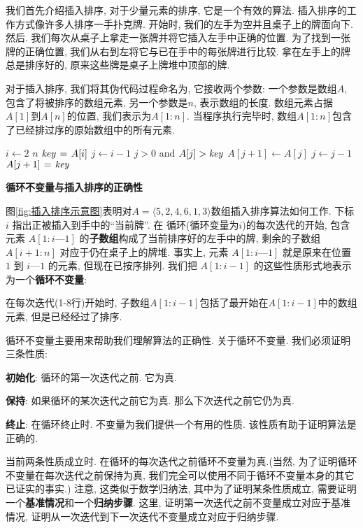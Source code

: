 \documentclass[oneside,10pt]{ctexbook}
\begin{document}
我们首先介绍插入排序, 对于少量元素的排序, 它是一个有效的算法. 插入排序的工作方式像许多人排序一手扑克牌. 开始时, 我们的左手为空并且桌子上的牌面向下. 然后. 我们每次从桌子上拿走一张牌并将它插入左手中正确的位置. 为了找到一张牌的正确位置, 我们从右到左将它与已在手中的每张牌进行比较. 拿在左手上的牌总是排序好的, 原来这些牌是桌子上牌堆中顶部的牌.

对于插入排序, 我们将其伪代码过程命名为, 它接收两个参数: 一个参数是数组$A$, 包含了将被排序的数组元素, 另一个参数是$n$, 表示数组的长度. 数组元素占据$A[1]$到$A[n]$的位置, 我们表示为$A[1:n]$. 当程序执行完毕时, 数组$A[1:n]$包含了已经排过序的原始数组中的所有元素.

\begin{codebox}
\li \For $i \gets 2$ \To $n$
\li \Do
$\id{key} \gets A[i]$
\li {}
\li $j \gets i-1$
\li \While $j > 0$ and $A[j] > \id{key}$
\li \Do
$A[j+1] \gets A[j]$
\li $j \gets j-1$
\End
\li $A[j+1] \gets \id{key}$
\End
\end{codebox}

\textbf{循环不变量与插入排序的正确性}

图\ref{fig:插入排序示意图}表明对$A=\langle 5, 2, 4, 6, 1, 3\rangle$数组插入排序算法如何工作. 下标 $i$ 指出正被插入到手中的``当前牌''. 在  循环(循环变量为$i$)的每次迭代的开始, 包含元素 $A[1:i—1]$ 的\textbf{子数组}构成了当前排序好的左手中的牌, 剩余的子数组 $A[i+1:n]$ 对应于仍在桌子上的牌堆. 事实上, 元素 $A[1:i—1]$ 就是原来在位置 $1$ 到 $i—1$ 的元素, 但现在已按序排列. 我们把 $A[1:i-1]$ 的这些性质形式地表示为一个\textbf{循环不变量}:



在每次迭代(1-8行)开始时, 子数组$A[1:i-1]$包括了最开始在$A[1:i-1]$中的数组元素, 但是已经经过了排序.

循环不变量主要用来帮助我们理解算法的正确性. 关于循环不变量. 我们必须证明三条性质:

\textbf{初始化}: 循环的第一次迭代之前. 它为真.

\textbf{保持}: 如果循环的某次迭代之前它为真. 那么下次迭代之前它仍为真.

\textbf{终止}: 在循环终止时. 不变量为我们提供一个有用的性质. 该性质有助于证明算法是正确的.

当前两条性质成立时. 在循环的每次迭代之前循环不变量为真.(当然, 为了证明循环不变量在每次迭代之前保持为真, 我们完全可以使用不同于循环不变量本身的其它已证实的事实.) 注意, 这类似于数学归纳法, 其中为了证明某条性质成立, 需要证明一个\textbf{基准情况}和一个\textbf{归纳步骤}. 这里, 证明第一次迭代之前不变量成立对应于基准情况, 证明从一次迭代到下一次迭代不变量成立对应于归纳步骤.
\end{document}
